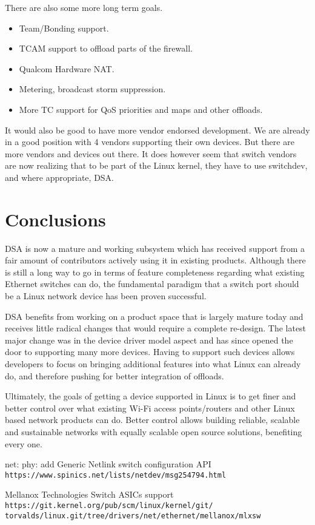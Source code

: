 \documentclass[letterpaper]{article}
\begin{document}
There are also some more long term goals.

\begin{itemize}
\item Team/Bonding support.
\item TCAM support to offload parts of the firewall.
\item Qualcom Hardware NAT.
\item Metering, broadcast storm suppression.
\item More TC support for QoS priorities and maps and other offloads.
\end{itemize}

It would also be good to have more vendor endorsed development. We are
already in a good position with 4 vendors supporting their own
devices. But there are more vendors and devices out there. It does
however seem that switch vendors are now realizing that to be part of
the Linux kernel, they have to use switchdev, and where appropriate,
DSA.

\section{Conclusions}

DSA is now a mature and working subsystem which has received support
from a fair amount of contributors actively using it in existing
products. Although there is still a long way to go in terms of feature
completeness regarding what existing Ethernet switches can do, the
fundamental paradigm that a switch port should be a Linux network
device has been proven successful.

DSA benefits from working on a product space that is largely mature today
and receives little radical changes that would require a complete re-design.
The latest major change was in the device driver model aspect and has since
opened the door to supporting many more devices. Having to support such
devices allows developers to focus on bringing additional features into
what Linux can already do, and therefore pushing for better integration of
offloads.

Ultimately, the goals of getting a device supported in Linux is to get
finer and better control over what existing Wi-Fi access points/routers
and other Linux based network products can do. Better control allows
building reliable, scalable and sustainable networks with equally
scalable open source solutions, benefiting every one.

\begin{thebibliography}{2}
net: phy: add Generic Netlink switch configuration API
\texttt{https://www.spinics.net/lists/netdev/msg254794.html}
 
Mellanox Technologies Switch ASICs support
\texttt{https://git.kernel.org/pub/scm/linux/kernel/git/\\
torvalds/linux.git/tree/drivers/net/ethernet/mellanox/mlxsw}
\end{thebibliography} 
\end{document}
